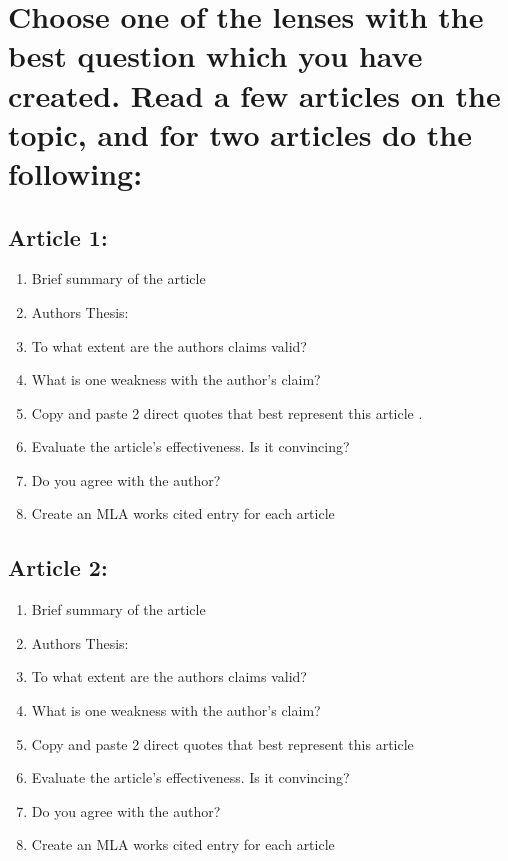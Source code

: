 \documentclass[11pt]{article}
\begin{document}
\section{Choose one of the lenses with the best question which you have created. Read a few articles on the topic, and for two articles do the following:}
\label{sec:org790248d}
\subsection{Article 1:}
\label{sec:org3e6f2bc}
\begin{enumerate}
\item Brief summary of the article
\item Authors Thesis:
\item To what extent are the authors claims valid?
\item What is one weakness with the author's claim?
\item Copy and paste 2 direct quotes that best represent this article .
\item Evaluate the article's effectiveness. Is it convincing?
\item Do you agree with the author?
\item Create an MLA works cited entry for each article
\end{enumerate}
\subsection{Article 2:}
\label{sec:org7a3692f}
\begin{enumerate}
\item Brief summary of the article
\item Authors Thesis:
\item To what extent are the authors claims valid?
\item What is one weakness with the author's claim?
\item Copy and paste 2 direct quotes that best represent this article
\item Evaluate the article's effectiveness. Is it convincing?
\item Do you agree with the author?
\item Create an MLA works cited entry for each article
\end{enumerate}
\end{document}

